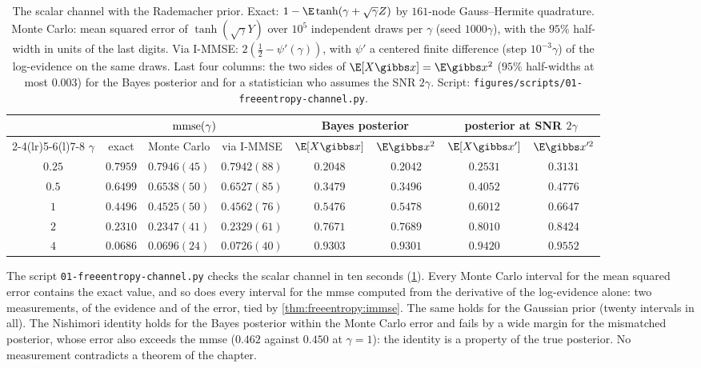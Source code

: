 \begin{refsection}
\begin{table}[t]
\begin{fullwidth}
\centering\small
\setlength{\tabcolsep}{4.5pt}
\begin{tabular}{@{}cccccccc@{}}
\toprule
& \multicolumn{3}{c}{$\mathrm{mmse}(\gamma)$} & \multicolumn{2}{c}{Bayes posterior} & \multicolumn{2}{c}{posterior at SNR $2\gamma$}\\
\cmidrule(lr){2-4}\cmidrule(lr){5-6}\cmidrule(l){7-8}
$\gamma$ & exact & Monte Carlo & via I-MMSE & $\E[X\gibbs x]$ & $\E\gibbs x^2$ & $\E[X\gibbs x']$ & $\E\gibbs x'^2$\\
\midrule
$0.25$ & $0.7959$ & $0.7946(45)$ & $0.7942(88)$ & $0.2048$ & $0.2042$ & $0.2531$ & $0.3131$\\
$0.5$ & $0.6499$ & $0.6538(50)$ & $0.6527(85)$ & $0.3479$ & $0.3496$ & $0.4052$ & $0.4776$\\
$1$ & $0.4496$ & $0.4525(50)$ & $0.4562(76)$ & $0.5476$ & $0.5478$ & $0.6012$ & $0.6647$\\
$2$ & $0.2310$ & $0.2347(41)$ & $0.2329(61)$ & $0.7671$ & $0.7689$ & $0.8010$ & $0.8424$\\
$4$ & $0.0686$ & $0.0696(24)$ & $0.0726(40)$ & $0.9303$ & $0.9301$ & $0.9420$ & $0.9552$\\
\bottomrule
\end{tabular}
\end{fullwidth}
\caption{The scalar channel with the Rademacher prior. Exact: $1-\E\tanh(\gamma+\sqrt\gamma Z)$ by $161$-node Gauss--Hermite quadrature. Monte Carlo: mean squared error of $\tanh(\sqrt\gamma Y)$ over $10^5$ independent draws per $\gamma$ (seed $1000\gamma$), with the $95\%$ half-width in units of the last digits. Via I-MMSE: $2(\frac12-\psi'(\gamma))$, with $\psi'$ a centered finite difference (step $10^{-3}\gamma$) of the log-evidence on the same draws. Last four columns: the two sides of $\E[X\gibbs x]=\E\gibbs x^2$ ($95\%$ half-widths at most $0.003$) for the Bayes posterior and for a statistician who assumes the SNR $2\gamma$. Script: \texttt{figures/scripts/01-freeentropy-channel.py}.}\label{tab:freeentropy:channel}
\end{table}

The script \texttt{01-freeentropy-channel.py} checks the scalar channel in ten seconds (\cref{tab:freeentropy:channel}). Every Monte Carlo interval for the mean squared error contains the exact value, and so does every interval for the mmse computed from the derivative of the log-evidence alone: two measurements, of the evidence and of the error, tied by \cref{thm:freeentropy:immse}. The same holds for the Gaussian prior (twenty intervals in all). The Nishimori identity holds for the Bayes posterior within the Monte Carlo error and fails by a wide margin for the mismatched posterior, whose error also exceeds the mmse ($0.462$ against $0.450$ at $\gamma=1$): the identity is a property of the true posterior. No measurement contradicts a theorem of the chapter.


\end{refsection}
